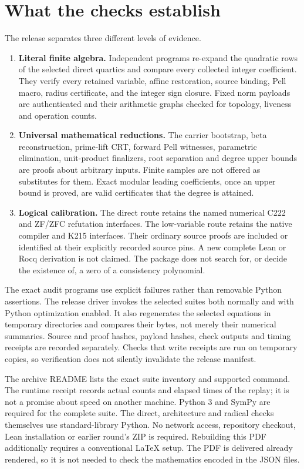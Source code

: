 \documentclass[11pt]{article}
\begin{document}
\section{What the checks establish}
\label{sec:checks}
The release separates three different levels of evidence.
\begin{enumerate}
\item \textbf{Literal finite algebra.} Independent programs re-expand the
quadratic rows of the selected direct quartics and compare every collected
integer coefficient. They verify every retained variable, affine
restoration, source binding, Pell macro, radius certificate, and the
integer sign closure. Fixed norm payloads are authenticated and their
arithmetic graphs checked for topology, liveness and operation counts.
\item \textbf{Universal mathematical reductions.} The carrier bootstrap,
beta reconstruction, prime-lift CRT, forward Pell witnesses, parametric
elimination, unit-product finalizers, root separation and degree upper
bounds are proofs about arbitrary inputs. Finite samples are not offered
as substitutes for them. Exact modular leading coefficients, once an
upper bound is proved, are valid certificates that the degree is attained.
\item \textbf{Logical calibration.} The direct route retains the named
numerical C222 and ZF/ZFC refutation interfaces. The low-variable route
retains the native compiler and K215 interfaces. Their ordinary source
proofs are included or identified at their explicitly recorded source pins. A new complete
Lean or Rocq derivation is not claimed. The package does not search for,
or decide the existence of, a zero of a consistency polynomial.
\end{enumerate}

The exact audit programs use explicit failures rather than removable
Python assertions. The release driver invokes the selected suites both
normally and with Python optimization enabled. It also regenerates the
selected equations in temporary directories and compares their bytes,
not merely their numerical summaries. Source and proof hashes, payload
hashes, check outputs and timing receipts are recorded separately.
Checks that write receipts are run on temporary copies, so verification
does not silently invalidate the release manifest.

The archive README lists the exact suite inventory and supported command.
The runtime receipt records actual counts and elapsed times of the replay;
it is not a promise about speed on another machine. Python 3 and SymPy
are required for the complete suite. The direct, architecture and radical
checks themselves use standard-library Python. No network access,
repository checkout, Lean installation or earlier round's ZIP is required.
Rebuilding this PDF additionally requires a conventional LaTeX setup.
The PDF is delivered already rendered, so it is not needed to check the
mathematics encoded in the JSON files.
\end{document}
